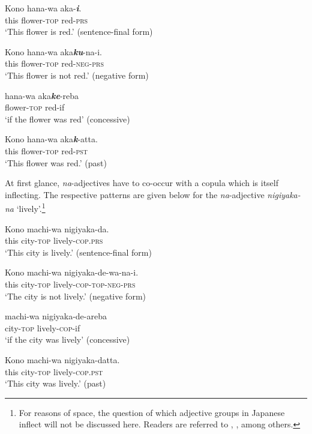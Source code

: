 \documentclass[output=paper,colorlinks,citecolor=brown]{langscibook}
\begin{document}
\begin{exe}
	\ex \label{12ex17}
	\gll Kono hana-wa aka-\textbf{\emph{i}}. \\
	this flower-\textsc{top} red-\textsc{prs} \\
	\trans ‘This flower is red.’ \hfill (sentence-final form)
	
	\ex \label{12ex18}
	\gll Kono hana-wa aka\textbf{\emph{ku}}-na-i. \\
	this flower-\textsc{top} red-\textsc{neg-prs} \\
	\trans ‘This flower is not red.’ \hfill (negative form)
	
	\ex \label{12ex19}
	\gll hana-wa aka\textbf{\emph{ke}}-reba \\
	flower-\textsc{top} red-if \\
	\trans ‘if the flower was red’ \hfill (concessive)
	
	\ex \label{12ex20}
	\gll Kono hana-wa aka\textbf{\emph{k}}-atta. \\
	this flower-\textsc{top} red-\textsc{pst} \\
	\trans ‘This flower was red.’ \hfill (past)
\end{exe}

At first glance, \emph{na}-adjectives have to co-occur with a copula which is itself inflecting. The respective patterns are given below for the \emph{na}-adjective \emph{nigiyaka-na} `lively'.\footnote{For reasons of space, the question of which adjective groups in Japanese inflect will not be discussed here. Readers are referred to \citet{uehara1998}, \citet{nishiyama1999}, \citet{yamakido2005} among others.}

\begin{exe}
	\ex \label{12ex21}
	\gll Kono machi-wa nigiyaka-da. \\
	this city-\textsc{top} lively-\textsc{cop.prs} \\
	\trans ‘This city is lively.’ \hfill (sentence-final form)
	
	\ex \label{12ex22}
	\gll Kono machi-wa nigiyaka-de-wa-na-i. \\
	this city-\textsc{top} lively-\textsc{cop-top-neg-prs} \\
	\trans ‘The city is not lively.’ \hfill (negative form)
	
	\ex \label{12ex23}
	\gll machi-wa nigiyaka-de-areba \\
	city-\textsc{top} lively-\textsc{cop}-if \\
	\trans ‘if the city was lively’ \hfill (concessive)
	
	\ex \label{12ex24}
	\gll Kono machi-wa nigiyaka-datta. \\
	this city-\textsc{top} lively-\textsc{cop.pst} \\
	\trans ‘This city was lively.’ \hfill (past)
\end{exe}
\end{document}
